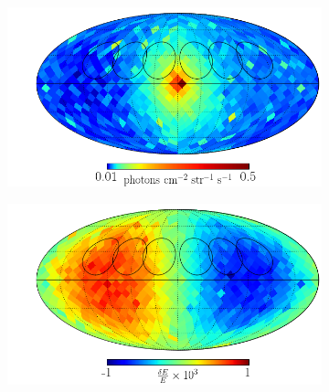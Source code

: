 \documentclass[aps,prd,10pt,twocolumn,superscriptaddress,showpacs]{revtex4-1}
\begin{document}

\begin{figure}[h!]
\centering
\begin{subfigure}[b]{1.0\columnwidth}
	\includegraphics[width=\textwidth]{flux_map_374.png}
\end{subfigure}
\par\medskip
\begin{subfigure}[b]{1.0\columnwidth}
	\includegraphics[width=\textwidth]{line_map_374.png}

\end{subfigure}
\end{figure}
\end{document}
